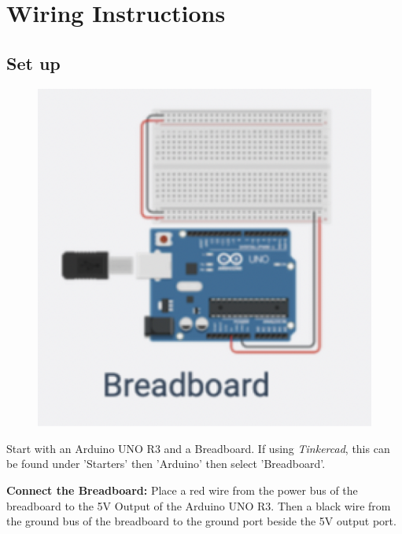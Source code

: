 \documentclass[a4paper]{article}
\begin{document}
\newpage
\section{Wiring Instructions}\label{sec:instructions}
\subsection{Set up}

\begin{figure}
  \vspace{-25pt}
  \begin{center}
    \includegraphics[width=1.1\linewidth]{breadboard.png}
  \end{center}
\vspace{-25pt}
\end{figure}

\noindent Start with an Arduino UNO R3 and a Breadboard. If using \emph{Tinkercad}, this can be found under 'Starters' then 'Arduino' then select 'Breadboard'.

\noindent \textbf{Connect the Breadboard:} Place a red wire from the power bus of the breadboard to the 5V Output of the Arduino UNO R3. Then a black wire from the ground bus of the breadboard to the ground port beside the 5V output port.
\end{document}
